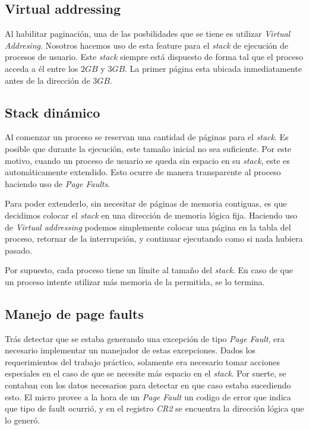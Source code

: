\documentclass[a4paper,10pt]{article}
\begin{document}
\subsection{Virtual addressing}

Al habilitar paginación, una de las posbilidades que se tiene es utilizar \textit{Virtual Addresing}.
Nosotros hacemos uso de esta feature para el \textit{stack} de ejecución de procesos de usuario.
Este \textit{stack} siempre está dispuesto de forma tal que el proceso acceda a él entre los $ 2GB $ y $ 3GB $.
La primer página esta ubicada inmediatamente antes de la dirección de $ 3GB $.

\subsection{Stack dinámico}

Al comenzar un proceso se reservan una cantidad de páginas para el \textit{stack}.
Es posible que durante la ejecución, este tamaño inicial no sea suficiente.
Por este motivo, cuando un proceso de usuario se queda sin espacio en su \textit{stack}, este es automáticamente extendido.
Esto ocurre de manera transparente al proceso haciendo uso de \textit{Page Faults}.

Para poder extenderlo, sin necesitar de páginas de memoria contiguas, es que decidimos colocar el \textit{stack} en una dirección de memoria lógica fija.
Haciendo uso de \textit{Virtual addressing} podemos simplemente colocar una página en la tabla del proceso, retornar de la interrupción, y continuar ejecutando
 como si nada hubiera pasado.

Por supuesto, cada proceso tiene un límite al tamaño del \textit{stack}.
En caso de que un proceso intente utilizar más memoria de la permitida, se lo termina.

\subsection{Manejo de page faults}

Trás detectar que se estaba generando una excepción de tipo \textit{Page Fault}, era necesario implementar un manejador de estas excepciones.
Dados los requerimientos del trabajo práctico, solamente era necesario tomar acciones especiales en el caso de que se necesite más espacio en el \textit{stack}.
Por suerte, se contaban con los datos necesarios para detectar en que caso estaba sucediendo esto.
El micro provee a la hora de un \textit{Page Fault} un codigo de error que indica que tipo de fault ocurrió, y en el registro \textit{CR2} se encuentra la dirección 
lógica que lo generó.
\end{document}
